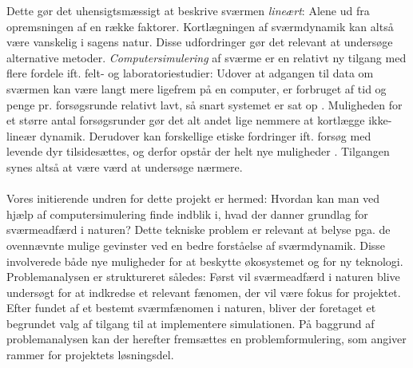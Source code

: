 Dette gør det uhensigtsmæssigt at beskrive sværmen \textit{lineært}: Alene ud fra opremsningen af en række faktorer. Kortlægningen af sværmdynamik kan altså være vanskelig i sagens natur.
Disse udfordringer gør det relevant at undersøge alternative metoder. \textit{Computersimulering} af sværme er en relativt ny tilgang med flere fordele ift. felt- og laboratoriestudier: Udover at adgangen til data om sværmen kan være langt mere ligefrem på en computer, er forbruget af tid og penge pr. forsøgsrunde relativt lavt, så snart systemet er sat op \cite{simulationintro1}\cite{simulationintro2}. Muligheden for et større antal forsøgsrunder gør det alt andet lige nemmere at kortlægge ikke-lineær dynamik. Derudover kan forskellige etiske fordringer ift. forsøg med levende dyr tilsidesættes, og derfor opstår der helt nye muligheder \cite{animalethics}. Tilgangen synes altså at være værd at undersøge nærmere.\\\\
Vores initierende undren for dette projekt er hermed: Hvordan kan man ved hjælp af computersimulering finde indblik i, hvad der danner grundlag for sværmeadfærd i naturen? Dette tekniske problem er relevant at belyse pga. de ovennævnte mulige gevinster ved en bedre forståelse af sværmdynamik. Disse involverede både nye muligheder for at beskytte økosystemet og for ny teknologi. \\
Problemanalysen er struktureret således: Først vil sværmeadfærd i naturen blive undersøgt for at indkredse et relevant fænomen, der vil være fokus for projektet.
Efter fundet af et bestemt sværmfænomen i naturen, bliver der foretaget et begrundet valg af tilgang til at implementere simulationen.  
På baggrund af problemanalysen kan der herefter fremsættes en problemformulering, som angiver rammer for projektets løsningsdel.





